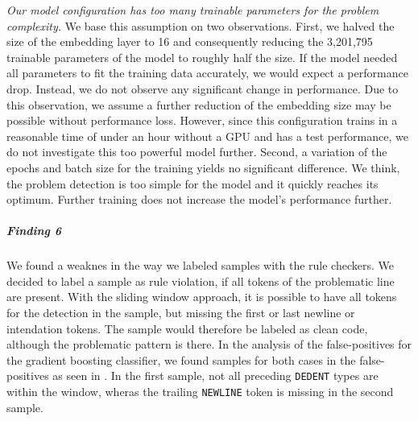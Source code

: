 \textit{Our model configuration has too many trainable parameters for the problem complexity.} We base this assumption on two observations. First, we halved the size of the embedding layer to 16 and consequently reducing the 3,201,795 trainable parameters of the model to roughly half the size. If the model needed all parameters to fit the training data accurately, we would expect a performance drop. Instead, we do not observe any significant change in performance. Due to this observation, we assume a further reduction of the embedding size may be possible without performance loss. However, since this configuration trains in a reasonable time of under an hour without a GPU and has a test performance, we do not investigate this too powerful model further.
Second, a variation of the epochs and batch size for the training yields no significant difference. We think, the problem detection is too simple for the model and it quickly reaches its optimum. Further training does not increase the model's performance further. 

\begin{center}
\end{center}

\subparagraph{Finding 6}
We found a weaknes in the way we labeled samples with the rule checkers. We decided to label a sample as rule violation, if all tokens of the problematic line are present. With the sliding window approach, it is possible to have all tokens for the detection in the sample, but missing the first or last newline or intendation tokens. The sample would therefore be labeled as clean code, although the problematic pattern is there. In the analysis of the false-positives for the gradient boosting classifier, we found samples for both cases in the false-positives as seen in . In the first sample, not all preceding \texttt{DEDENT} types are within the window, wheras the trailing \texttt{NEWLINE} token is missing in the second sample.

